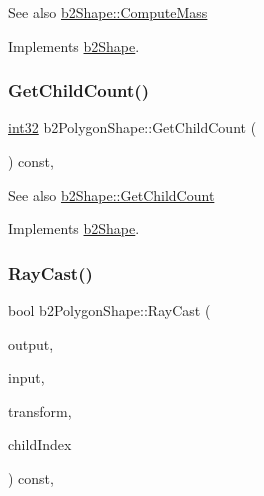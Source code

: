 \begin{DoxySeeAlso}{See also}
\mbox{\hyperlink{classb2_shape_a61b365526241b47f124789b0309cac69}{b2\+Shape\+::\+Compute\+Mass}} 
\end{DoxySeeAlso}


Implements \mbox{\hyperlink{classb2_shape_a61b365526241b47f124789b0309cac69}{b2\+Shape}}.

\mbox{\label{classb2_polygon_shape_aa8bb0d5a88624104425cdee0b2f4427a}} 
\subsubsection{\texorpdfstring{GetChildCount()}{GetChildCount()}}
{\footnotesize\ttfamily \mbox{\hyperlink{b2_settings_8h_a43d43196463bde49cb067f5c20ab8481}{int32}} b2\+Polygon\+Shape\+::\+Get\+Child\+Count (\begin{DoxyParamCaption}{ }\end{DoxyParamCaption}) const\hspace{0.3cm}{\ttfamily [override]}, {\ttfamily [virtual]}}

\begin{DoxySeeAlso}{See also}
\mbox{\hyperlink{classb2_shape_a05a3c445017d96df9238ceefe6ce37ab}{b2\+Shape\+::\+Get\+Child\+Count}} 
\end{DoxySeeAlso}


Implements \mbox{\hyperlink{classb2_shape_a05a3c445017d96df9238ceefe6ce37ab}{b2\+Shape}}.

\mbox{\label{classb2_polygon_shape_a41f20072763688f1745f12f67f40e904}} 
\subsubsection{\texorpdfstring{RayCast()}{RayCast()}}
{\footnotesize\ttfamily bool b2\+Polygon\+Shape\+::\+Ray\+Cast (\begin{DoxyParamCaption}\item[{\mbox{\hyperlink{structb2_ray_cast_output}{b2\+Ray\+Cast\+Output}} $\ast$}]{output,  }\item[{const \mbox{\hyperlink{structb2_ray_cast_input}{b2\+Ray\+Cast\+Input}} \&}]{input,  }\item[{const \mbox{\hyperlink{structb2_transform}{b2\+Transform}} \&}]{transform,  }\item[{\mbox{\hyperlink{b2_settings_8h_a43d43196463bde49cb067f5c20ab8481}{int32}}}]{child\+Index }\end{DoxyParamCaption}) const\hspace{0.3cm}{\ttfamily [override]}, {\ttfamily [virtual]}}



